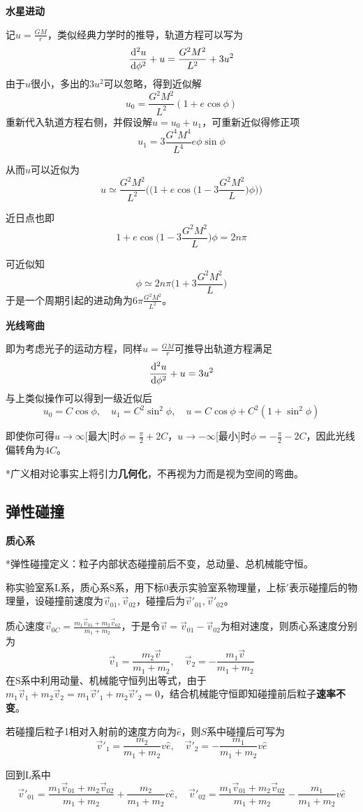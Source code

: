 \documentclass[a4paper,UTF8,fontset=windows]{ctexart}
\newcommand*{\dr}{\hspace{0.07em}\mathrm{d}}
\begin{document}
\textbf{水星进动}

记$u=\frac{GM}{r}$，类似经典力学时的推导，轨道方程可以写为
$$\frac{\dr^2u}{\dr\phi^2}+u=\frac{G^2M^2}{L^2}+3u^2$$
由于$u$很小，多出的$3u^2$可以忽略，得到近似解
$$u_0=\frac{G^2M^2}{L^2}(1+e\cos\phi)$$
重新代入轨道方程右侧，并假设解$u=u_0+u_1$，可重新近似得修正项
$$u_1=3\frac{G^4M^4}{L^4}e\phi\sin\phi$$

从而$u$可以近似为
$$u\simeq\frac{G^2M^2}{L^2}\bigg(\bigg(1+e\cos\bigg(1-3\frac{G^2M^2}{L}\bigg)\phi\bigg)\bigg)$$

近日点也即
$$1+e\cos\bigg(1-3\frac{G^2M^2}{L}\bigg)\phi=2n\pi$$

可近似知
$$\phi\simeq 2n\pi\bigg(1+3\frac{G^2M^2}{L}\bigg)$$
于是一个周期引起的进动角为$6\pi\frac{G^2M^2}{L^2}$。

\textbf{光线弯曲}

即为考虑光子的运动方程，同样$u=\frac{GM}{r}$可推导出轨道方程满足
$$\frac{\dr^2u}{\dr\phi^2}+u=3u^2$$
与上类似操作可以得到一级近似后
$$u_0=C\cos\phi,\quad u_1=C^2\sin^2\phi,\quad u=C\cos\phi+C^2(1+\sin^2\phi)$$

即使你可得$u\to\infty$[最大]时$\phi=\frac{\pi}{2}+2C$，$u\to-\infty$[最小]时$\phi=-\frac{\pi}{2}-2C$，因此光线偏转角为$4C$。

*广义相对论事实上将引力\textbf{几何化}，不再视为力而是视为空间的弯曲。

\subsection{弹性碰撞}
\textbf{质心系}

*弹性碰撞定义：粒子内部状态碰撞前后不变，总动量、总机械能守恒。

称实验室系L系，质心系S系，用下标0表示实验室系物理量，上标$\prime$表示碰撞后的物理量，设碰撞前速度为$\vec{v}_{01},\vec{v}_{02}$，碰撞后为$\vec{v}'_{01},\vec{v}'_{02}$。

质心速度$\vec{v}_{0C}=\frac{m_1\vec{v}_{01}+m_2\vec{v}_{02}}{m_1+m_2}$，于是令$\vec{v}=\vec{v}_{01}-\vec{v}_{02}$为相对速度，则质心系速度分别为
$$\vec{v}_1=\frac{m_2\vec{v}}{m_1+m_2},\quad\vec{v}_2=-\frac{m_1\vec{v}}{m_1+m_2}$$
在S系中利用动量、机械能守恒列出等式，由于$m_1\vec{v}_1+m_2\vec{v}_2=m_1\vec{v}'_1+m_2\vec{v}'_2=0$，结合机械能守恒即知碰撞前后粒子\textbf{速率不变}。

若碰撞后粒子1相对入射前的速度方向为$\hat{e}$，则$S$系中碰撞后可写为
$$\vec{v}'_1=\frac{m_2}{m_1+m_2}v\hat{e},\quad\vec{v}'_2=-\frac{m_1}{m_1+m_2}v\hat{e}$$

回到L系中
$$\vec{v}'_{01}=\frac{m_1\vec{v}_{01}+m_2\vec{v}_{02}}{m_1+m_2}+\frac{m_2}{m_1+m_2}v\hat{e},\quad\vec{v}'_{02}=\frac{m_1\vec{v}_{01}+m_2\vec{v}_{02}}{m_1+m_2}-\frac{m_1}{m_1+m_2}v\hat{e}$$
\end{document}
